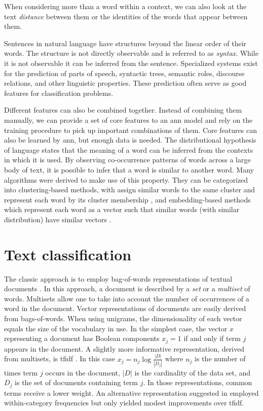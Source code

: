 When considering more than a word within a context, we can also look
at the text \emph{distance} between them or the identities of the
words that appear between them.

Sentences in natural language have structures beyond the linear order
of their words. The structure is not directly observable and is
referred to as \emph{syntax}. While it is not observable it can be
inferred from the sentence. Specialized systems exist for the
prediction of parts of speech, syntactic trees, semantic roles,
discourse relations, and other linguistic properties. These prediction
often serve as good features for classification problems.

Different features can also be combined together. Instead of combining
them manually, we can provide a set of core features to an \ac{ann}
model and rely on the training procedure to pick up important
combinations of them.
Core features can also be learned by \ac{ann}, but enough data is
needed. The distributional hypothesis of language states that the
meaning of a word can be inferred from the contexts in which it is
used. By observing co-occurrence patterns of words across a large body
of text, it is possible to infer that a word is similar to another
word. Many algorithms were derived to make use of this property. They
can be categorized into clustering-based methods, with assign similar
words to the same cluster and represent each word by its cluster
membership \cite{miller2004name}, and embedding-based methods which
represent each word as a 
vector such that similar words (with similar distribution) have
similar vectors \cite{pennington_glove:_2014,mikolov_linguistic_2013}.

\section{Text classification}
\label{sec-baselines}
The classic approach is to employ bag-of-words
representations of textual documents
\cite{manning_introduction_2008}. In this approach, a document is 
described by a \textit{set} or a \textit{multiset} of words.
Multisets allow one to take into account the number of occurrences of
a word in the document. Vector representations of documents are easily
derived from bags-of-words. When using unigrams, the dimensionality of
each vector equals the size of the vocabulary in use. In the simplest
case, the vector $x$ representing a document has Boolean components
$x_j=1$ if and only if term $j$ appears in the document. A slightly more
informative representation, derived from multisets, is \ac{tfidf}
\cite{manning_introduction_2008}. In this case 
$x_j=n_j\log \frac{|D|}{|D_j|}$ where $n_j$ is the number of times
term $j$ occurs in the document, $|D|$ is the cardinality of the
data set, and $D_j$ is the set of documents containing term $j$. In
those representations, common terms receive a lower weight. An
alternative representation suggested in
\cite{martinez_information_2011} employed within-category frequencies
but only yielded modest improvements over \ac{tfidf}.

